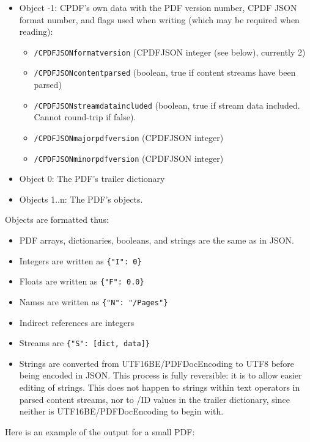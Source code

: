 \documentclass{book}
\begin{document}
\begin{itemize}
\item Object -1: CPDF's own data with the PDF version number, CPDF JSON format
number, and flags used when writing (which may be required when reading):

\begin{itemize}
  \item \texttt{/CPDFJSONformatversion} (CPDFJSON integer (see below), currently 2)
  \item \texttt{/CPDFJSONcontentparsed} (boolean, true if content streams have been parsed)
  \item \texttt{/CPDFJSONstreamdataincluded} (boolean, true if stream data included. Cannot
  round-trip if false).
  \item \texttt{/CPDFJSONmajorpdfversion} (CPDFJSON integer)
  \item \texttt{/CPDFJSONminorpdfversion} (CPDFJSON integer)
\end{itemize}

\item Object 0: The PDF's trailer dictionary

\item Objects 1..n: The PDF's objects.
\end{itemize}

\noindent Objects are formatted thus:

\begin{itemize}
  \item PDF arrays, dictionaries, booleans, and strings are the same as in JSON.
  \item Integers are written as \texttt{\{"I":\ 0\}}
  \item Floats are written as \texttt{\{"F":\ 0.0\}}
  \item Names are written as \texttt{\{"N":\ "/Pages"\}}
  \item Indirect references are integers
  \item Streams are \texttt{\{"S":\ [dict, data]\}}
  \item Strings are converted from UTF16BE/PDFDocEncoding to UTF8 before being
  encoded in JSON. This process is fully reversible: it is to allow
  easier editing of strings. This does not happen to strings within text
  operators in parsed content streams, nor to /ID values in the
  trailer dictionary, since neither is UTF16BE/PDFDocEncoding to begin with. 
\end{itemize}

\noindent Here is an example of the output for a small PDF:
\end{document}
